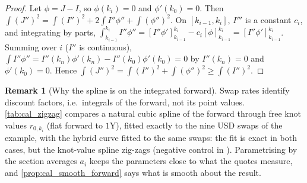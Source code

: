 \documentclass[11pt,english]{amsart}
\theoremstyle{definition}
\newtheorem{rema}{Remark}
\begin{document}
\begin{proof}
Let $\phi = J - I$, so $\phi(k_i) = 0$ and $\phi'(k_0) = 0$. Then $\int(J'')^2 = \int(I'')^2 + 2\int I''\phi'' + \int(\phi'')^2$. On $[k_{i-1},k_i]$, $I'''$ is a constant $c_i$, and integrating by parts, $\int_{k_{i-1}}^{k_i} I''\phi'' = [I''\phi']_{k_{i-1}}^{k_i} - c_i[\phi]_{k_{i-1}}^{k_i} = [I''\phi']_{k_{i-1}}^{k_i}$. Summing over $i$ ($I''$ is continuous), $\int I''\phi'' = I''(k_n)\phi'(k_n) - I''(k_0)\phi'(k_0) = 0$ by $I''(k_n) = 0$ and $\phi'(k_0) = 0$. Hence $\int(J'')^2 = \int(I'')^2 + \int(\phi'')^2 \ge \int(I'')^2$.
\end{proof}

\begin{rema}[Why the spline is on the integrated forward]
Swap rates identify discount factors, i.e.\ integrals of the forward, not its point values. \autoref{tab:cal_zigzag} compares a natural cubic spline of the forward through free knot values $r_{0,k_i}$ (flat forward to $1$Y), fitted exactly to the nine USD swaps of the example, with the hybrid curve fitted to the same swaps: the fit is exact in both cases, but the knot-value spline zig-zags (negative control in ). Parametrising by the section averages $a_i$ keeps the parameters close to what the quotes measure, and \autoref{prop:cal_smooth_forward} says what is smooth about the result.
\begin{table}[h]
\centering\footnotesize

\caption{Instantaneous forward at the knots, USD swaps of the EURUSD example (DCB), both fits exact.}
\label{tab:cal_zigzag}
\end{table}
\end{rema}
\end{document}
